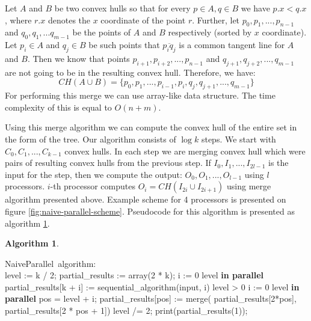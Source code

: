 \documentclass[letterpaper]{article}
\theoremstyle{definition}
\newtheorem{algorithm}{Algorithm}
\begin{document}
Let $A$ and $B$ be two convex hulls so that for every $p \in A, q \in B$ we have $p.x < q.x$, where $r.x$ denotes the $x$ coordinate of the point $r$.
Further, let $p_0, p_1, ..., p_{n-1}$ and $q_0, q_1, ... q_{m-1}$ be the points of $A$ and $B$ respectively (sorted by $x$ coordinate).
Let $p_i \in A$ and $q_j \in B$ be such points that $\overline{p_iq_j}$ is a common tangent line for $A$ and $B$.
Then we know that points $p_{i+1}, p_{i + 2}, ..., p_{n - 1}$ and $q_{j + 1}, q_{j + 2}, ..., q_{m - 1}$ are not going to be in the resulting convex hull.
Therefore, we have:
$$CH(A \cup B) = \{ p_0, p_1, ..., p_{i - 1}, p_i, q_j, q_{j + 1}, ..., q_{m - 1} \}$$
For performing this merge we can use array-like data structure.
The time complexity of this is equal to $O(n + m)$.

Using this merge algorithm we can compute the convex hull of the entire set in the form of the tree.
Our algorithm consists of $\log k$ steps.
We start with $C_0, C_1, ..., C_{k-1}$ convex hulls.
In each step we are merging convex hull which were pairs of resulting convex hulls from the previous step. 
If $I_0, I_1, ..., I_{2l - 1}$ is the input for the step, then we compute the output: $O_0, O_1, ..., O_{l - 1}$ using $l$ processors. 
$i$-th processor computes $O_i = CH(I_{2i} \cup I_{2i+1})$ using merge algorithm presented above.
Example scheme for 4 processors is presented on figure \ref{fig:naive-parallel-scheme}.
Pseudocode for this algorithm is presented as algorithm \ref{alg:naive-parallel}.

\begin{algorithm}
\label{alg:naive-parallel}
\begin{program}
\mbox{NaiveParallel algorithm:}
\BEGIN \\ %
  level := k / 2;
  partial\_results := array(2 * k);
  \FOR i := 0 \TO level  \textrm{\bf{\;in parallel}} \DO
    partial\_results[k + i] := 
    \;\;\;\; sequential\_algorithm(input, i)
  \OD
  \WHILE level > 0 \DO
    \FOR i := 0 \TO level  \textrm{\bf{\;in parallel}} \DO
      pos = level + i;
      partial\_results[pos] := merge(
      \;\;\;\; partial\_results[2*pos],
      \;\;\;\; partial\_results[2 * pos + 1])
    \OD
    level /= 2;
  \OD
  print(partial\_results(1));

\END
\end{program}
\end{algorithm}
\end{document}
